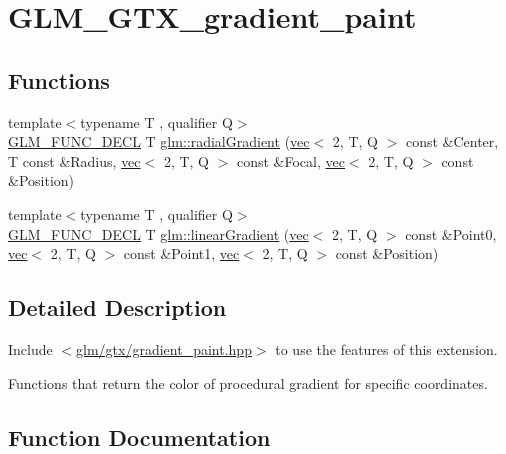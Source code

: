 \hypertarget{group__gtx__gradient__paint}{}\section{G\+L\+M\+\_\+\+G\+T\+X\+\_\+gradient\+\_\+paint}
\label{group__gtx__gradient__paint}
\subsection*{Functions}
\begin{DoxyCompactItemize}
\item 
{\footnotesize template$<$typename T , qualifier Q$>$ }\\\mbox{\hyperlink{setup_8hpp_ab2d052de21a70539923e9bcbf6e83a51}{G\+L\+M\+\_\+\+F\+U\+N\+C\+\_\+\+D\+E\+CL}} T \mbox{\hyperlink{group__gtx__gradient__paint_gaaecb1e93de4cbe0758b882812d4da294}{glm\+::radial\+Gradient}} (\mbox{\hyperlink{structglm_1_1vec}{vec}}$<$ 2, T, Q $>$ const \&Center, T const \&Radius, \mbox{\hyperlink{structglm_1_1vec}{vec}}$<$ 2, T, Q $>$ const \&Focal, \mbox{\hyperlink{structglm_1_1vec}{vec}}$<$ 2, T, Q $>$ const \&Position)
\item 
{\footnotesize template$<$typename T , qualifier Q$>$ }\\\mbox{\hyperlink{setup_8hpp_ab2d052de21a70539923e9bcbf6e83a51}{G\+L\+M\+\_\+\+F\+U\+N\+C\+\_\+\+D\+E\+CL}} T \mbox{\hyperlink{group__gtx__gradient__paint_ga849241df1e55129b8ce9476200307419}{glm\+::linear\+Gradient}} (\mbox{\hyperlink{structglm_1_1vec}{vec}}$<$ 2, T, Q $>$ const \&Point0, \mbox{\hyperlink{structglm_1_1vec}{vec}}$<$ 2, T, Q $>$ const \&Point1, \mbox{\hyperlink{structglm_1_1vec}{vec}}$<$ 2, T, Q $>$ const \&Position)
\end{DoxyCompactItemize}


\subsection{Detailed Description}
Include $<$\mbox{\hyperlink{gradient__paint_8hpp}{glm/gtx/gradient\+\_\+paint.\+hpp}}$>$ to use the features of this extension.

Functions that return the color of procedural gradient for specific coordinates. 

\subsection{Function Documentation}
\mbox{\label{group__gtx__gradient__paint_ga849241df1e55129b8ce9476200307419}} 

